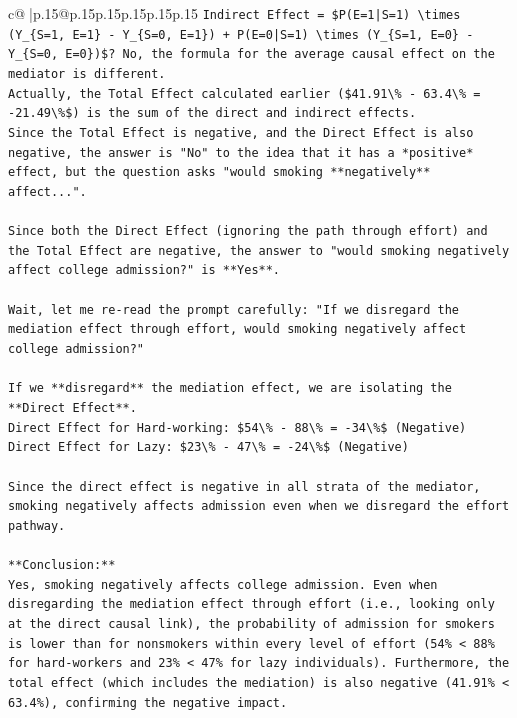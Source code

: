 \documentclass{article}
\begin{document}
{\begin{supertabular}{c@{$\;$}|p{.15\linewidth}@{}p{.15\linewidth}p{.15\linewidth}p{.15\linewidth}p{.15\linewidth}p{.15\linewidth}}
{{{\texttt{Indirect Effect = \$P(E=1|S=1) \textbackslash{}times (Y\_\{S=1, E=1\} {-} Y\_\{S=0, E=1\}) + P(E=0|S=1) \textbackslash{}times (Y\_\{S=1, E=0\} {-} Y\_\{S=0, E=0\})\$? No, the formula for the average causal effect on the mediator is different.} \\
\texttt{Actually, the Total Effect calculated earlier (\$41.91\textbackslash{}\% {-} 63.4\textbackslash{}\% = {-}21.49\textbackslash{}\%\$) is the sum of the direct and indirect effects.} \\
\texttt{Since the Total Effect is negative, and the Direct Effect is also negative, the answer is "No" to the idea that it has a *positive* effect, but the question asks "would smoking **negatively** affect...".} \\
\\ 
\texttt{Since both the Direct Effect (ignoring the path through effort) and the Total Effect are negative, the answer to "would smoking negatively affect college admission?" is **Yes**.} \\
\\ 
\texttt{Wait, let me re{-}read the prompt carefully: "If we disregard the mediation effect through effort, would smoking negatively affect college admission?"} \\
\\ 
\texttt{If we **disregard** the mediation effect, we are isolating the **Direct Effect**.} \\
\texttt{Direct Effect for Hard{-}working: \$54\textbackslash{}\% {-} 88\textbackslash{}\% = {-}34\textbackslash{}\%\$ (Negative)} \\
\texttt{Direct Effect for Lazy: \$23\textbackslash{}\% {-} 47\textbackslash{}\% = {-}24\textbackslash{}\%\$ (Negative)} \\
\\ 
\texttt{Since the direct effect is negative in all strata of the mediator, smoking negatively affects admission even when we disregard the effort pathway.} \\
\\ 
\texttt{**Conclusion:**} \\
\texttt{Yes, smoking negatively affects college admission. Even when disregarding the mediation effect through effort (i.e., looking only at the direct causal link), the probability of admission for smokers is lower than for nonsmokers within every level of effort (54\% < 88\% for hard{-}workers and 23\% < 47\% for lazy individuals). Furthermore, the total effect (which includes the mediation) is also negative (41.91\% < 63.4\%), confirming the negative impact.} \\
}}}
\end{supertabular}}
\end{document}
